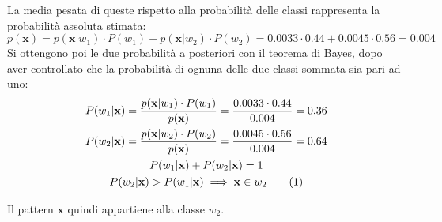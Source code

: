 \documentclass{article}
\numberwithin{equation}{section}
\newcommand{\tageq}{\tag{\stepcounter{equation}\theequation}}
\newcommand{\vect}[1]{\boldsymbol{\mathbf{#1}}}
\begin{document}
La media pesata di queste rispetto alla probabilità delle classi rappresenta la probabilità assoluta stimata:
\begin{equation*}
    p(\vect{x})=p(\vect{x}|w_1)\cdot P(w_1)+p(\vect{x}|w_2)\cdot P(w_2)=0.0033\cdot0.44+0.0045\cdot0.56=0.004
\end{equation*}
Si ottengono poi le due probabilità a posteriori con il teorema di Bayes, dopo aver controllato che la probabilità di ognuna delle due classi sommata sia pari ad uno:
\begin{gather*}
    P(w_1|\vect{x})=\displaystyle\frac{p(\vect{x}|w_1)\cdot P(w_1)}{p(\vect{x})}=\frac{0.0033\cdot0.44}{0.004}=0.36\\
    P(w_2|\vect{x})=\displaystyle\frac{p(\vect{x}|w_2)\cdot P(w_2)}{p(\vect{x})}=\frac{0.0045\cdot0.56}{0.004}=0.64\\
    P(w_1|\vect{x})+P(w_2|\vect{x})=1\\
    P(w_2|\vect{x})>P(w_1|\vect{x})\implies \vect{x}\in w_2\tageq
\end{gather*}

Il pattern $\vect{x}$ quindi appartiene alla classe $w_2$. 
\end{document}
